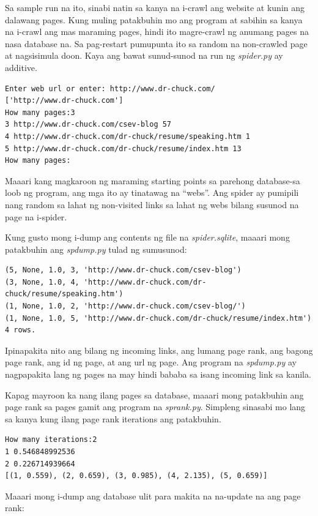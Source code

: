 \documentclass[10pt,]{book}
\begin{document}
Sa sample run na ito, sinabi natin sa kanya na i-crawl ang website at
kunin ang dalawang pages. Kung muling patakbuhin mo ang program at
sabihin sa kanya na i-crawl ang mas maraming pages, hindi ito
magre-crawl ng anumang pages na nasa database na. Sa pag-restart
pumupunta ito sa random na non-crawled page at nagsisimula doon. Kaya
ang bawat sunud-sunod na run ng \emph{spider.py} ay additive.

{\small
\begin{verbatim}
Enter web url or enter: http://www.dr-chuck.com/
['http://www.dr-chuck.com']
How many pages:3
3 http://www.dr-chuck.com/csev-blog 57
4 http://www.dr-chuck.com/dr-chuck/resume/speaking.htm 1
5 http://www.dr-chuck.com/dr-chuck/resume/index.htm 13
How many pages:
\end{verbatim}
}

Maaari kang magkaroon ng maraming starting points sa parehong
database-sa loob ng program, ang mga ito ay tinatawag na ``webs''. Ang
spider ay pumipili nang random sa lahat ng non-visited links sa lahat ng
webs bilang susunod na page na i-spider.

Kung gusto mong i-dump ang contents ng file na \emph{spider.sqlite},
maaari mong patakbuhin ang \emph{spdump.py} tulad ng sumusunod:

{\small
\begin{verbatim}
(5, None, 1.0, 3, 'http://www.dr-chuck.com/csev-blog')
(3, None, 1.0, 4, 'http://www.dr-chuck.com/dr-chuck/resume/speaking.htm')
(1, None, 1.0, 2, 'http://www.dr-chuck.com/csev-blog/')
(1, None, 1.0, 5, 'http://www.dr-chuck.com/dr-chuck/resume/index.htm')
4 rows.
\end{verbatim}
}

Ipinapakita nito ang bilang ng incoming links, ang lumang page rank, ang
bagong page rank, ang id ng page, at ang url ng page. Ang program na
\emph{spdump.py} ay nagpapakita lang ng pages na may hindi bababa sa
isang incoming link sa kanila.

Kapag mayroon ka nang ilang pages sa database, maaari mong patakbuhin
ang page rank sa pages gamit ang program na \emph{sprank.py}. Simpleng
sinasabi mo lang sa kanya kung ilang page rank iterations ang
patakbuhin.

{\small
\begin{verbatim}
How many iterations:2
1 0.546848992536
2 0.226714939664
[(1, 0.559), (2, 0.659), (3, 0.985), (4, 2.135), (5, 0.659)]
\end{verbatim}
}

Maaari mong i-dump ang database ulit para makita na na-update na ang
page rank:
\end{document}
